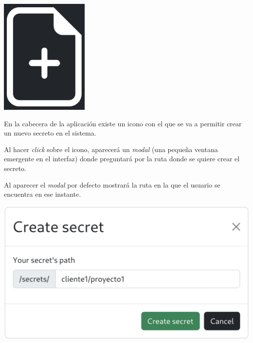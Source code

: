 \documentclass{\ClassPath/viu-tfm-template}
\begin{document}
{
\begin{minipage}{0.1\linewidth}
    \includegraphics[width=\linewidth]{img/new.png}
\end{minipage}
\hfill
\begin{minipage}{0.85\linewidth}
    En la cabecera de la aplicación existe un icono con el que se va a permitir crear un nuevo secreto en el sistema.

    Al hacer \textit{click} sobre el icono, aparecerá un \textit{modal} (una pequeña ventana emergente en el interfaz) donde preguntará por la ruta donde se quiere crear el secreto.
\end{minipage}
}

Al aparecer el \textit{modal} por defecto mostrará la ruta en la que el usuario se encuentra en ese instante.

\begin{center}
    \includegraphics[width=0.7\linewidth]{img/new_secret.png}
\end{center}
\end{document}
